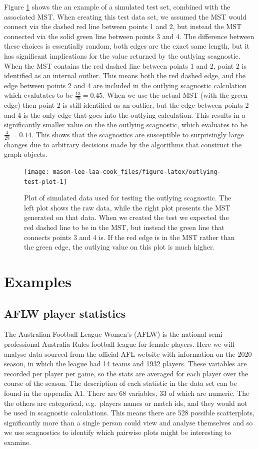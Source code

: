 Figure \ref{fig:outlying-test-plot} shows the an example of a simulated test set, combined with the associated MST. When creating this test data set, we assumed the MST would connect via the dashed red line between points 1 and 2, but instead the MST connected via the solid green line between points 3 and 4. The difference between these choices is essentially random, both edges are the exact same length, but it has significant implications for the value returned by the outlying scagnostic. When the MST contains the red dashed line between points 1 and 2, point 2 is identified as an internal outlier. This means both the red dashed edge, and the edge between points 2 and 4 are included in the outlying scagnostic calculation which evalutates to be \(\frac{13}{29}=0.45\). When we use the actual MST (with the green edge) then point 2 is still identified as an outlier, but the edge between points 2 and 4 is the only edge that goes into the outlying calculation. This results in a significantly smaller value on the the outlying scagnostic, which evaluates to be \(\frac{4}{29}=0.14\). This shows that the scagnostics are susceptible to surprisingly large changes due to arbitrary decisions made by the algorithms that construct the graph objects.

\begin{figure}
\texttt{[image: mason-lee-laa-cook\_files/figure-latex/outlying-test-plot-1]} \caption{Plot of simulated data used for testing the outlying scagnostic. The left plot shows the raw data, while the right plot presents the MST generated on that data. When we created the test we expected the red dashed line to be in the MST, but instead the green line that connects points 3 and 4 is. If the red edge is in the MST rather than the green edge, the outlying value on this plot is much higher.}\label{fig:outlying-test-plot}
\end{figure}

\section{Examples}\label{examples}

\subsection{AFLW player statistics}\label{aflw-player-statistics}

The Australian Football League Women's (AFLW) is the national semi-professional Australia Rules football league for female players. Here we will analyse data sourced from the official AFL website with information on the 2020 season, in which the league had 14 teams and 1932 players. These variables are recorded per player per game, so the stats are averaged for each player over the course of the season. The description of each statistic in the data set can be found in the appendix A1. There are 68 variables, 33 of which are numeric. The the others are categorical, e.g.~players names or match ids, and they would not be used in scagnostic calculations. This means there are 528 possible scatterplots, significantly more than a single person could view and analyse themselves and so we use scagnostics to identify which pairwise plots might be interesting to examine.


